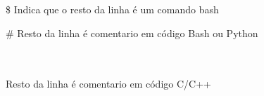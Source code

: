 	\begin{listaespecial}[BIGNAMEWIDTH]
		\item[\$] Indica que o resto da linha é um comando bash
		\item[\#] Resto da linha é comentario em código Bash ou Python
		\item[\\\\] Resto da linha é comentario em código C/C++
	\end{listaespecial} 

\sumario

